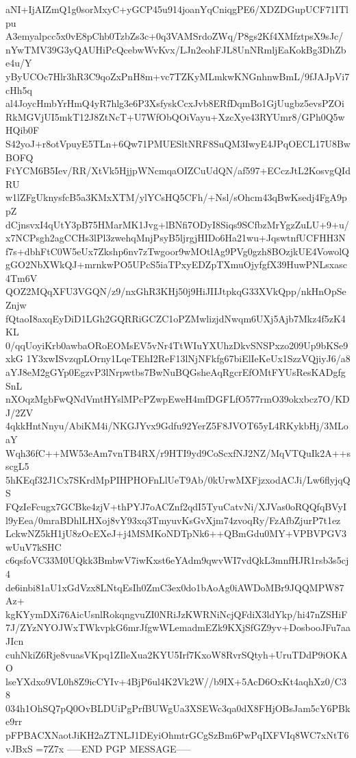 aNI+IjAIZmQ1g0sorMxyC+yGCP45u914joanYqCniqgPE6/XDZDGupUCF71ITlpu
A3emyalpcc5x0vE8pChb0TzbZs3c+0q3VAMSrdoZWq/P8gs2Kf4XMfztpsX9sJc/
nYwTMV39G3yQAUHiPcQcebwWvKvx/LJn2eohFJL8UnNRmljEaKokBg3DhZbe4u/Y
yByUCOc7Hlr3hR3C9qoZxPnH8m+vc7TZKyMLmkwKNGnhnwBmL/9fJAJpVi7cHh5q
al4JoycHmbYrHmQ4yR7hlg3e6P3XsfyskCcxJvb8ERfDqmBo1GjUugbz5evsPZOi
RkMGVjUI5mkT12J8ZtNcT+U7WfObQOiVayu+XzcXye43RYUmr8/GPh0Q5wHQib0F
S42yoJ+r8otVpuyE5TLn+6Qw71PMUESltNRF8SuQM3IwyE4JPqOECL17U8BwBOFQ
FtYCM6B5Iev/RR/XtVk5HjjpWNcmqaOIZCuUdQN/af597+ECczJtL2KosvgQIdRU
w1lZFgUknysfcB5a3KMxXTM/ylYCsHQ5CFh/+Nsl/sOhcm43qBwKsedj4FgA9ppZ
dCjnsvxI4qUtY3pB75HMarMK1Jvg+lBNfi7ODyI8Siqs9SCfbzMrYgzZuLU+9+u/
x7NCPsgh2agCCHs3lPl3zwehqMnjPsyB5ljrgjHIDo6Ha21wu+JqswtnfUCFHH3N
f7s+dbhFtC0W5eUx7Zkshp6nv7zTwgoor9wMOtlAg9PVg0gzh8BOzjkUE4VowolQ
gGO2NbXWkQJ+mrnkwPO5UPcS5iaTPxyEDZpTXmuOjyfgfX39HuwPNLsxasc4Tm6V
QOZ2MQqXFU3VGQN/z9/nxGhR3KHj50j9HiJIIJtpkqG33XVkQpp/nkHnOpSeZnjw
fQtaoI8axqEyDiD1LGh2GQRRiGCZC1oPZMwlizjdNwqm6UXj5Ajb7Mkz4f5zK4KL
0/qqUoyiKrb0awbaORoEOMsEV5vNr4TtWIuYXUhzDkvSNSPxzo209Up9bKSe9xkG
1Y3xwISvzqpLOrny1LqeTEhI2ReF13lNjNFkfg67biElIeKeUx1SzzVQjiyJ6/a8
aYJ8eM2gGYp0EgzvP3lNrpwtbs7BwNuBQGsheAqRgcrEfOMtFYUsResKADgfgSnL
nXOqzMgbFwQNdVmtHYslMPcPZwpEweH4mfDGFLfO577rmO39okxbcz7O/KDJ/2ZV
4qkkHntNnyu/AbiKM4i/NKGJYvx9Gdfu92YerZ5F8JVOT65yL4RKykbHj/3MLoaY
Wqh36fC++MW53eAm7vnTB4RX/r9HTI9yd9CoScxfNJ2NZ/MqVTQuIk2A++sscgL5
5hKEqf32J1Cx7SKrdMpPIHPHOFnLlUeT9Ab/0kUrwMXFjzxodACJi/Lw6flyjqQS
FQzIeFcugx7GCBke4zjV+thPYJ7oACZnf2qdI5TyuCatvNi/XJVas0oRQQfqBVyI
l9yEea/0mraBDhlLHXoj8vY93xq3TmyuvKsGvXjm74zvoqRy/FzAfbZjurP7t1ez
LckwNZ5kH1jU8zOcEXeJ+j4MSMKoNDTpNk6++QBmGdu0MY+VPBVPGV3wUuV7kSHC
c6qsfoVC33M0UQkk3BmbwV7iwKxst6eYAdm9qwvWI7vdQkL3mnfHJR1rsb3s5cj4
de6inbi81aU1xGdVzx8LNtqEsIh0ZmC3ex0do1bAoAg0iAWDoMBr9JQQMPW87Az+
kgKYymDXi76AicUsnlRokqngvuZI0NRiJzKWRNiNcjQFdiX3ldYkp/hi47nZSHiF
7J/ZYzNYOJWxTWkvpkG6mrJfgwWLemadmEZk9KXjSfGZ9yv+DosbooJFu7aaJIcn
cuhNkiZ6Rje8vuasVKpq1ZIleXua2KYU5Irf7KxoW8RvrSQtyh+UruTDdP9iOKAO
lseYXdxo9VL0h8Z9icCYIv+4BjP6ul4K2Vk2W//b9IX+5AcD6OxKt4aqhXz0/C38
034h1OhSQ7pQ0OvBLDUiPgPrfBUWgUa3XSEWc3qa0dX8FHjOBsJam5cY6PBke9rr
pFPBACXNaotJiKH2aZTNLJ1DEyiOhmtrGCgSzBm6PwPqIXFVIq8WC7xNtT6vJBxS
=7Z7x
-----END PGP MESSAGE-----
